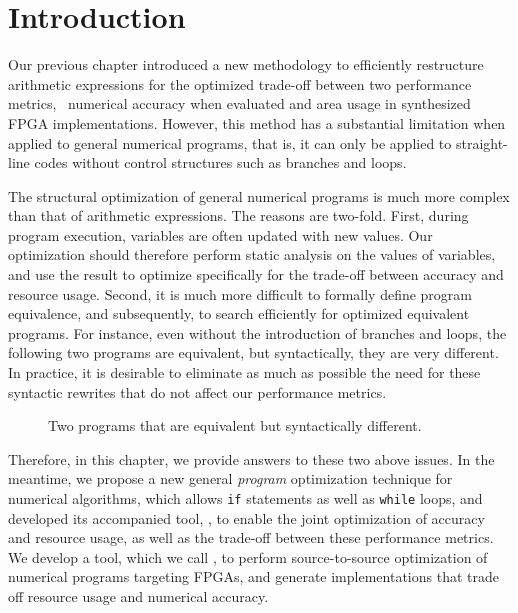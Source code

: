 \section{Introduction}
\label{po:sec:introduction}

Our previous chapter introduced a new methodology to efficiently restructure
arithmetic expressions for the optimized trade-off between two performance
metrics, \ie~numerical accuracy when evaluated and area usage in synthesized
FPGA implementations.  However, this method has a substantial limitation when
applied to general numerical programs, that is, it can only be applied to
straight-line codes without control structures such as branches and loops.

The structural optimization of general numerical programs is much more complex
than that of arithmetic expressions.  The reasons are two-fold.  First,
during program execution, variables are often updated with new values.  Our
optimization should therefore perform static analysis on the values of
variables, and use the result to optimize specifically for the trade-off
between accuracy and resource usage.  Second, it is much more difficult to
formally define program equivalence, and subsequently, to search efficiently
for optimized equivalent programs.  For instance, even without the introduction
of branches and loops, the following two programs are equivalent, but
syntactically, they are very different.  In practice, it is desirable to
eliminate as much as possible the need for these syntactic rewrites that do not
affect our performance metrics.

\begin{figure}[ht]
    \centering
     \qquad \qquad
    \caption{Two programs that are equivalent but syntactically different.}
    \label{po:fig:equiv_progs}
\end{figure}

Therefore, in this chapter, we provide answers to these two above issues.  In
the meantime, we propose a new general \emph{program} optimization technique
for numerical algorithms, which allows \texttt{if} statements as well as
\texttt{while} loops, and developed its accompanied tool, \newsoap, to enable
the joint optimization of accuracy and resource usage, as well as the trade-off
between these performance metrics.  We develop a tool, which we call \newsoap,
to perform source-to-source optimization of numerical programs targeting FPGAs,
and generate implementations that trade off resource usage and numerical
accuracy.


